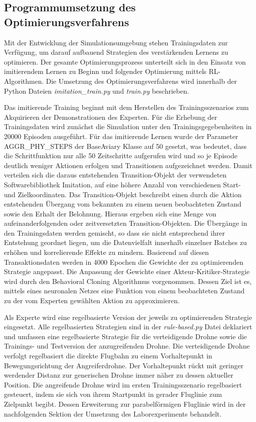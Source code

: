 \subsection{Programmumsetzung des Optimierungsverfahrens}

Mit der Entwicklung der Simulationsumgebung stehen Trainingsdaten zur Verfügung, um darauf aufbauend Strategien des verstärkenden Lernens zu optimieren.
Der gesamte Optimierungsprozess unterteilt sich in den Einsatz von imitierendem Lernen zu Beginn und folgender Optimierung mittels RL-Algorithmen. 
Die Umsetzung des Optimierungsverfahrens wird innerhalb der Python Dateien \textit{imitation\_train.py} und \textit{train.py} beschrieben.

Das imitierende Training beginnt mit dem Herstellen des Trainingsszenarios zum Akquirieren der Demonstrationen des Experten. 
Für die Erhebung der Trainingsdaten wird zunächst die Simulation unter den Trainingsgegebenheiten in 20000 Episoden ausgeführt.
Für das imitierende Lernen wurde der Parameter AGGR\_PHY\_STEPS der BaseAviary Klasse auf 50 gesetzt, was bedeutet, dass die Schrittfunktion nur alle 50 Zeitschritte aufgerufen wird und so je Episode deutlich weniger Aktionen erfolgen und Transitionen aufgezeichnet werden.
Damit verteilen sich die daraus entstehenden Transition-Objekt der verwendeten Softwarebibliothek Imitation, auf eine höhere Anzahl von verschiedenen Start- und Zielkoordinaten.
Das Transition-Objekt beschreibt einen durch die Aktion entstehenden Übergang vom bekannten zu einem neuen beobachteten Zustand sowie den Erhalt der Belohnung.
Hieraus ergeben sich eine Menge von aufeinanderfolgenden oder zeitversetzten Transition-Objekten.
Die Übergänge in den Trainingsdaten werden gemischt, so dass sie nicht entsprechend ihrer Entstehung geordnet liegen, um die Datenvielfalt innerhalb einzelner Batches zu erhöhen und korrelierende Effekte zu mindern. 
Basierend auf diesen Transaktionsdaten werden in 4000 Epochen die Gewichte der zu optimierenden Strategie angepasst.
Die Anpassung der Gewichte einer Akteur-Kritiker-Strategie wird durch den Behavioral Cloning Algorithmus vorgenommen.
Dessen Ziel ist es, mittels eines neuronalen Netzes eine Funktion von einem beobachteten Zustand zu der vom Experten gewählten Aktion zu approximieren.

Als Experte wird eine regelbasierte Version der jeweils zu optimierenden Strategie eingesetzt.
Alle regelbasierten Strategien sind in der \textit{rule-based.py} Datei deklariert und umfassen eine regelbasierte Strategie für die verteidigende Drohne sowie die Trainings- und Testversion der anzugreifenden Drohne.
Die verteidigende Drohne verfolgt regelbasiert die direkte Flugbahn zu einem Vorhaltepunkt in Bewegungsrichtung der Angreiferdrohne.
Der Vorhaltepunkt rückt mit geringer werdender Distanz zur generischen Drohne immer näher zu dessen aktueller Position.
Die angreifende Drohne wird im ersten Trainingsszenario regelbasiert gesteuert, indem sie sich von ihrem Startpunkt in gerader Fluglinie zum Zielpunkt begibt.
Dessen Erweiterung zur parabelförmigen Fluglinie wird in der nachfolgenden Sektion der Umsetzung des Laborexperiments behandelt. 

